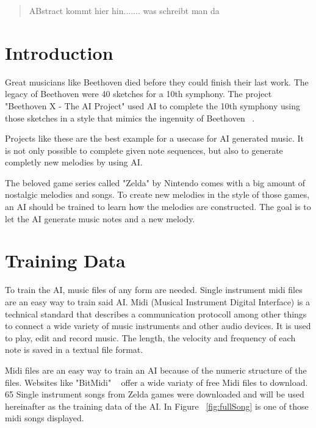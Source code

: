 \maketitle

\begin{abstract}
ABstract kommt hier hin....... was schreibt man da

\end{abstract}

\section{Introduction}
\label{intro}

Great musicians like Beethoven died before they could finish their last work. The legacy
of Beethoven were 40 sketches for a 10th symphony. The project "Beethoven X - The AI 
Project" used AI to complete the 10th symphony using those sketches in a style that
mimics the ingenuity of Beethoven ~\cite{test:1}.

Projects like these are the best example for a usecase for AI generated music. It is not
only possible to complete given note sequences, but also to generate completly new 
melodies by using AI.

The beloved game series called "Zelda" by Nintendo comes with a big amount of nostalgic
melodies and songs. To create new melodies in the style of those games, an AI should be
trained to learn how the melodies are constructed. The goal is to let the AI generate
music notes and a new melody.

\section{Training Data}
\label{trainingdata}

To train the AI, music files of any form are needed. Single instrument
midi files are an easy way to train said AI. Midi (Musical Instrument Digital
Interface) is a technical standard that describes a communication protocoll
among other things to connect a wide variety of music instruments and other
audio devices. It is used to play, edit and record music. The length, the
velocity and frequency of each note is saved in a textual file format.

Midi files are an easy way to train an AI because of the numeric structure
of the files. Websites like "BitMidi" ~\cite{test:2} offer a wide variaty 
of free Midi files to download. 65 Single instrument songs from Zelda games 
were downloaded and will be used hereinafter as the training data of the AI.
In Figure ~\ref{fig:fullSong} is one of those midi songs displayed.

